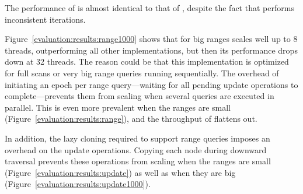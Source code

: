 The performance of \autoSkiplist is almost
identical to that of \skiplist, despite the fact that \skiplist performs inconsistent iterations.

Figure~\ref{evaluation:results:range1000}
shows that for big ranges \bronson scales well up to 8 threads, outperforming
all other implementations, but then its performance drops down at 32 threads.
The reason could be that this implementation is
optimized for full scans or very big range queries running sequentially.
The overhead of initiating an epoch per range query---waiting for all
pending update operations to complete---prevents them from scaling when 
several queries are executed in parallel. This is even more prevalent when the
ranges are small (Figure~\ref{evaluation:results:range}), and the throughput of
\bronson flattens out. 
  
In addition, the lazy cloning required to support
range queries imposes an overhead on the update operations. Copying each node
during downward traversal prevents these operations from scaling when
the ranges are small (Figure~\ref{evaluation:results:update}) as well as when
they are big (Figure~\ref{evaluation:results:update1000}).
